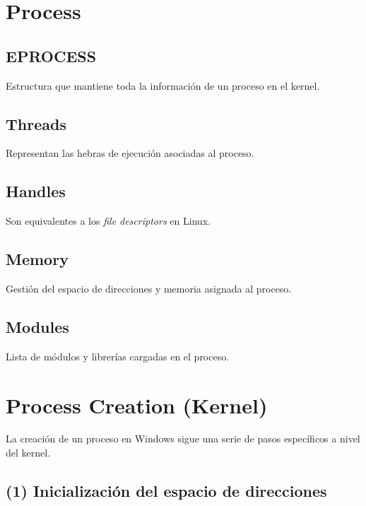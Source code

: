 \section{Process}

\subsection{EPROCESS}
Estructura que mantiene toda la información de un proceso en el kernel.

\subsection{Threads}
Representan las hebras de ejecución asociadas al proceso.

\subsection{Handles}
Son equivalentes a los \textit{file descriptors} en Linux.

\subsection{Memory}
Gestión del espacio de direcciones y memoria asignada al proceso.

\subsection{Modules}
Lista de módulos y librerías cargadas en el proceso.

\section{Process Creation (Kernel)}

La creación de un proceso en Windows sigue una serie de pasos específicos a nivel
del kernel.

\subsection*{(1) Inicialización del espacio de direcciones}

